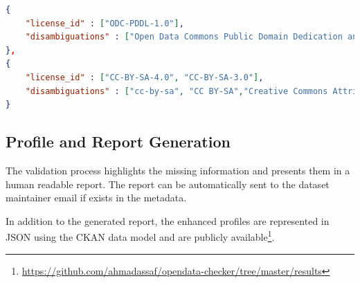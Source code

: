 \documentclass[runningheads,a4paper]{llncs}
\begin{document}
\begin{lstlisting}[language=json]
{
	"license_id" : ["ODC-PDDL-1.0"],
	"disambiguations" : ["Open Data Commons Public Domain Dedication and License (PDDL)"]
},
{
	"license_id" : ["CC-BY-SA-4.0", "CC-BY-SA-3.0"],
	"disambiguations" : ["cc-by-sa", "CC BY-SA","Creative Commons Attribution Share-Alike"]
}
\end{lstlisting}





\subsection{Profile and Report Generation}

The validation process highlights the missing information and presents them in a human readable report. The report can be automatically sent to the dataset maintainer email if exists in the metadata.

In addition to the generated report, the enhanced profiles are represented in JSON using the CKAN data model and are publicly available\footnote{\url{https://github.com/ahmadassaf/opendata-checker/tree/master/results}}.
\end{document}
